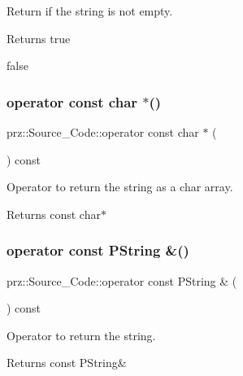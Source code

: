 Return if the string is not empty. 

\begin{DoxyReturn}{Returns}
true 

false 
\end{DoxyReturn}
\mbox{\label{classprz_1_1_source___code_ad23958a94d4d9bf384e1793846579942}} 
\subsubsection{\texorpdfstring{operator const char $\ast$()}{operator const char *()}}
{\footnotesize\ttfamily prz\+::\+Source\+\_\+\+Code\+::operator const char $\ast$ (\begin{DoxyParamCaption}{ }\end{DoxyParamCaption}) const\hspace{0.3cm}{\ttfamily [inline]}}



Operator to return the string as a char array. 

\begin{DoxyReturn}{Returns}
const char$\ast$ 
\end{DoxyReturn}
\mbox{\label{classprz_1_1_source___code_a24694b6a8d40fc32cfa6cf972f30f252}} 
\subsubsection{\texorpdfstring{operator const PString \&()}{operator const PString \&()}}
{\footnotesize\ttfamily prz\+::\+Source\+\_\+\+Code\+::operator const P\+String \& (\begin{DoxyParamCaption}{ }\end{DoxyParamCaption}) const\hspace{0.3cm}{\ttfamily [inline]}}



Operator to return the string. 

\begin{DoxyReturn}{Returns}
const P\+String\& 
\end{DoxyReturn}
\mbox{\label{classprz_1_1_source___code_affa31ffbe288e203e4bd5abe86dfdcb0}} 
